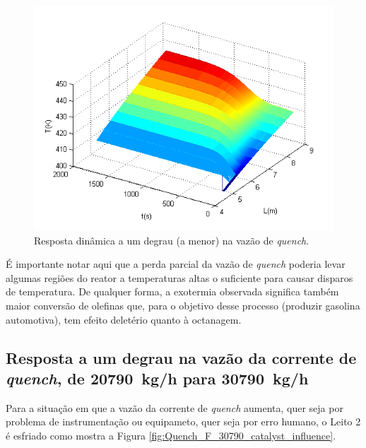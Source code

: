 \begin{figure}[htb]
\centering
\includegraphics[scale=0.8]{images/Chap4/Quench_F_10790_catalyst_influence.png}
\caption{Resposta dinâmica a um degrau (a menor) na vazão de \emph{quench}.}
\label{fig:Quench_F_10790_catalyst_influence}
\end{figure}

É importante notar aqui que a perda parcial da vazão de \emph{quench} poderia
levar algumas regiões do reator a temperaturas altas o suficiente para causar
disparos de temperatura. De qualquer forma, a exotermia observada significa
também maior conversão de olefinas que, para o objetivo desse processo (produzir
gasolina automotiva), tem efeito deletério quanto à octanagem.

\subsection{Resposta a um degrau na vazão da corrente de \emph{quench}, de
\SI{20790}{kg/h} para \SI{30790}{kg/h}} \label{sec:respostaaumdegrauvazao3}

Para a situação em que a vazão da corrente de \emph{quench} aumenta, quer seja
por problema de instrumentação ou equipameto, quer seja por erro humano, o Leito
2 é esfriado como mostra a Figura \autoref{fig:Quench_F_30790_catalyst_influence}.

